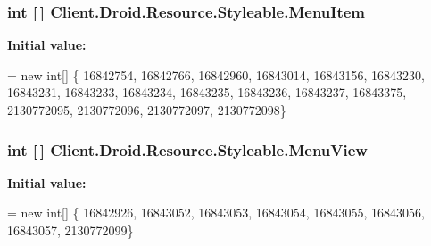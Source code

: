 \subsubsection[{Menu\+Item}]{\setlength{\rightskip}{0pt plus 5cm}int \mbox{[}$\,$\mbox{]} Client.\+Droid.\+Resource.\+Styleable.\+Menu\+Item\hspace{0.3cm}{\ttfamily [static]}}\label{classClient_1_1Droid_1_1Resource_1_1Styleable_a457b0570e56ec16a97ee1dd48e676839}
{\bfseries Initial value\+:}
\begin{DoxyCode}
= \textcolor{keyword}{new} \textcolor{keywordtype}{int}[]
            \{
                    16842754,
                    16842766,
                    16842960,
                    16843014,
                    16843156,
                    16843230,
                    16843231,
                    16843233,
                    16843234,
                    16843235,
                    16843236,
                    16843237,
                    16843375,
                    2130772095,
                    2130772096,
                    2130772097,
                    2130772098\}
\end{DoxyCode}
\hypertarget{classClient_1_1Droid_1_1Resource_1_1Styleable_af4b86c822a5f78e7e452d75b878f52d8}{}
\subsubsection[{Menu\+View}]{\setlength{\rightskip}{0pt plus 5cm}int \mbox{[}$\,$\mbox{]} Client.\+Droid.\+Resource.\+Styleable.\+Menu\+View\hspace{0.3cm}{\ttfamily [static]}}\label{classClient_1_1Droid_1_1Resource_1_1Styleable_af4b86c822a5f78e7e452d75b878f52d8}
{\bfseries Initial value\+:}
\begin{DoxyCode}
= \textcolor{keyword}{new} \textcolor{keywordtype}{int}[]
            \{
                    16842926,
                    16843052,
                    16843053,
                    16843054,
                    16843055,
                    16843056,
                    16843057,
                    2130772099\}
\end{DoxyCode}
\hypertarget{classClient_1_1Droid_1_1Resource_1_1Styleable_a5937cedcaa4ac84fb292ee6bba0575bb}{}
